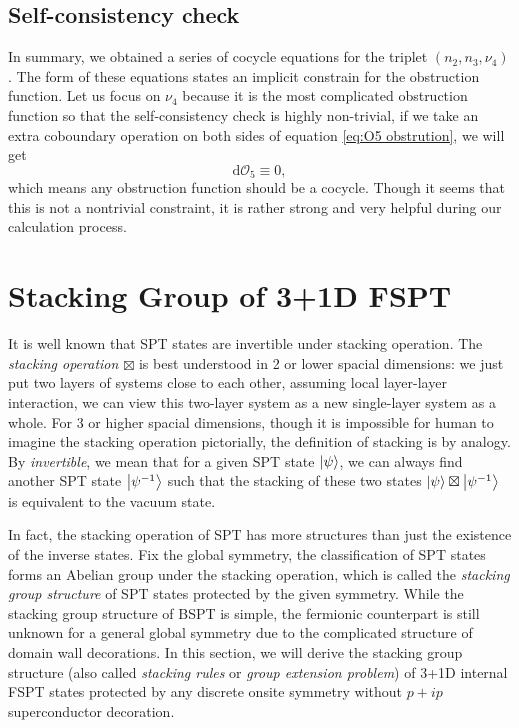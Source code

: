 \documentclass[%
 reprint,
 amsmath,amssymb,
 aps,
prb,
]{revtex4-2}
\begin{document}
\subsection{Self-consistency check}

In summary, we obtained a series of cocycle equations for the triplet $(n_2, n_3, \nu_4)$.
The form of these equations states an implicit constrain for the obstruction function.
Let us focus on $\nu_4$ because it is the most complicated obstruction function so that the self-consistency check is highly non-trivial, if we take an extra coboundary operation on both sides of equation \eqref{eq:O5 obstrution}, we will get 
\begin{equation}
\mathrm{d} \mathcal{O}_5 \equiv 0 ,
\end{equation}
which means any obstruction function should be a cocycle.
Though it seems that this is not a nontrivial constraint, it is rather strong and very helpful during our calculation process.


\section{Stacking Group of 3+1D FSPT}

It is well known that SPT states are invertible under stacking operation.
The \textit{stacking operation $\boxtimes$} is best understood in 2 or lower spacial dimensions: we just put two layers of systems close to each other, assuming local layer-layer interaction, we can view this two-layer system as a new single-layer system as a whole.
For 3 or higher spacial dimensions, though it is impossible for human to imagine the stacking operation pictorially, the definition of stacking is by analogy.
By \textit{invertible}, we mean that for a given SPT state $\ket{\psi}$, we can always find another SPT state $\ket{\psi^{-1}}$ such that the stacking of these two states $\ket{\psi} \boxtimes \ket{\psi^{-1}}$ is equivalent to the vacuum state.

In fact, the stacking operation of SPT has more structures than just the existence of the inverse states.
Fix the global symmetry, the classification of SPT states forms an Abelian group under the stacking operation, which is called the \textit{stacking group structure} of SPT states protected by the given symmetry.
While the stacking group structure of BSPT is simple, the fermionic counterpart is still unknown for a general global symmetry due to the complicated structure of domain wall decorations.
In this section, we will derive the stacking group structure (also called \textit{stacking rules} or \textit{group extension problem}) of 3+1D internal FSPT states protected by any discrete onsite symmetry without $p+ip$ superconductor decoration.
\end{document}
